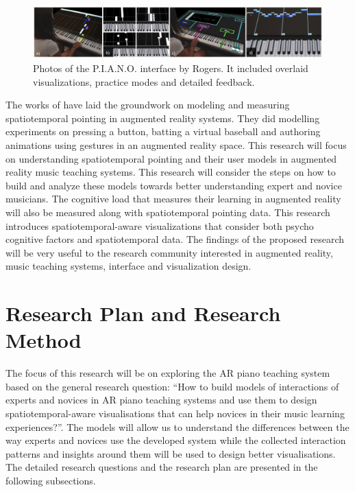 \documentclass[manuscript,screen]{acmart}
\begin{document}
\begin{figure}[h]
\centering
 \includegraphics[width=12cm]{figures/pianoUBC.png}
    \caption{Photos of the P.I.A.N.O. interface by Rogers. It included overlaid visualizations, practice modes and detailed feedback. 
    }\label{fig:ubicomp}
\end{figure}
The works of  have laid the groundwork on modeling and measuring spatiotemporal pointing in augmented reality systems. They did modelling experiments on pressing a button, batting a virtual baseball and authoring animations using gestures in an augmented reality space. This research will focus on understanding spatiotemporal pointing and their user models in augmented reality music teaching systems. This research will consider the steps on how to build and analyze these models towards better understanding expert and novice musicians. The cognitive load that measures their learning in augmented reality will also be measured along with spatiotemporal pointing data. This research introduces spatiotemporal-aware visualizations that consider both psycho cognitive factors and spatiotemporal data. The findings of the proposed research will be very useful to the research community interested in augmented reality, music teaching systems, interface  and visualization design.\\

\section{Research Plan and Research Method}
The focus of this research will be on exploring the AR piano teaching system based on the general research question: “How to  build models of interactions of experts and novices in AR piano teaching systems and use them to design spatiotemporal-aware visualisations that can help novices in their music learning experiences?”. The models will allow us to understand the differences between the way experts and novices use the developed system while the collected interaction patterns and insights around them will be used to design better visualisations.\\

The detailed research questions and the research plan are presented in the following subsections. 
\end{document}
